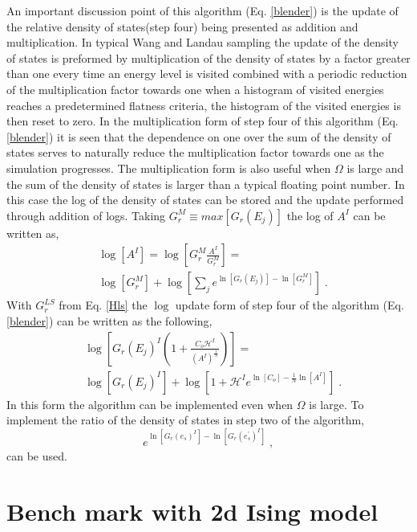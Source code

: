 \documentclass[aps,pre,reprint,superscriptaddress,showkeys]{revtex4-2}
\begin{document}
An important discussion point of this algorithm (Eq. \ref{blender}) is the update of the relative density of states(step four) being presented as addition and multiplication.
 In  typical Wang and Landau sampling the update of the density of states is preformed by multiplication of the density of states by a factor greater than one every time an energy level is visited combined with a periodic reduction of the multiplication factor towards one when a histogram of visited energies reaches a predetermined flatness criteria, the histogram of the visited energies is then reset to zero. In the multiplication form of step four of this algorithm (Eq. \ref{blender}) it is seen that the dependence on one over the sum of the density of states serves to naturally reduce the multiplication factor towards one as the simulation progresses. The multiplication form is also useful when $\Omega$ is large and the sum of the density of states is larger than a typical floating point number. In this case the log of the density of states can be stored and the update performed through addition of logs. Taking $G_{r}^M \equiv  max[G_{r}(E_j)]$ the log of $A^{I}$ can be written as, 
\begin{equation}
\begin{split}
& \log[A^{I}] = \log[G_{r}^M \frac{A^{I}}{G_{r}^M}]=\\
&\log[G_{r}^M] + \log[\sum_j e^{\ln[G_{r}(E_j)] - \ln[G_{r}^M]} ] \;.
\end{split}
\label{Hls}
\end{equation} 
With $G_r^{LS}$ from Eq. \ref{Hls} the $\log$ update form of step four of the algorithm (Eq. \ref{blender}) can be written as the following, 
\begin{equation}
\begin{split}
& \log[ G_{r}(E_j)^{I}( 1 +  \frac{C_o \mathcal{H}^I }{ (A^{I})^{\frac{1}{N} } } ) ]=\\
& \log[ G_{r}(E_j)^{I} ] + \log[1 +   \mathcal{H}^Ie^{\ln[C_o]-\frac{1}{N}\ln[A^{I}]}] \;.
\end{split}
\end{equation}
In this form  the algorithm can be implemented even when $\Omega$ is large. To implement the ratio of the density of states in step two of the algorithm, 
\begin{equation}
e^{\ln[G_{r}(e_s)^{I}] - \ln[G_{r}(e_s^{'})^{I}]} \;,
\end{equation}
can be used.

 

\section{Bench mark with 2d Ising model}
\label{sec2}
\end{document}
